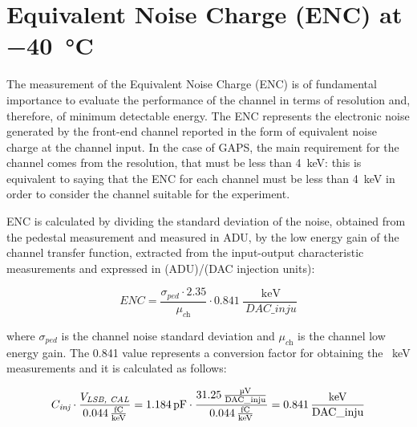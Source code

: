 
\section{Equivalent Noise Charge (ENC) at \SI{-40}{\celsius}} \label{ENC} %
The measurement of the Equivalent Noise Charge (ENC) is of fundamental importance to evaluate the performance of the channel in terms of resolution and, therefore, of minimum detectable energy. The ENC represents the electronic noise generated by the front-end channel reported in the form of equivalent noise charge at the channel input. In the case of GAPS, the main requirement for the channel comes from the resolution, that must be less than \SI{4}{\kilo\electronvolt}: this is equivalent to saying that the ENC for each channel must be less than \SI{4}{\kilo\electronvolt} in order to consider the channel suitable for the experiment.

\par
ENC is calculated by dividing the standard deviation of the noise, obtained from the pedestal measurement and measured in ADU, by the low energy gain of the channel transfer function, extracted from the input-output characteristic measurements and expressed in (ADU)/(DAC injection units):

\begin{equation}
    ENC = \frac{\sigma_{\textit{ped}} \cdot 2.35}{\mu_{\textit{ch}}} \cdot \SI{0.841}{\frac{\SI{}{\kilo\electronvolt}}{\SI{}{DAC\_inju}}} 
\end{equation}

\noindent
where $\sigma_{\textit{ped}}$ is the channel noise standard deviation and $\mu_{\textit{ch}}$ is the channel low energy gain. The \SI{0.841}{} value represents a conversion factor for obtaining the \SI{}{\kilo\electronvolt} measurements and it is calculated as follows:

\begin{equation}
    C_{\textit{inj}} \cdot \frac{V_{\textit{LSB, CAL}}}{\SI{0.044}{\frac{fC}{\kilo\electronvolt}}} = \SI{1.184}{\pico\farad} \cdot \frac{\SI{31.25}{\frac{\micro\volt}{DAC\_inju}}}{\SI{0.044}{\frac{fC}{\kilo\electronvolt}}} = \SI{0.841}{\frac{\kilo\electronvolt}{DAC\_inju}}
    \label{eqConversionFactor}
\end{equation}

